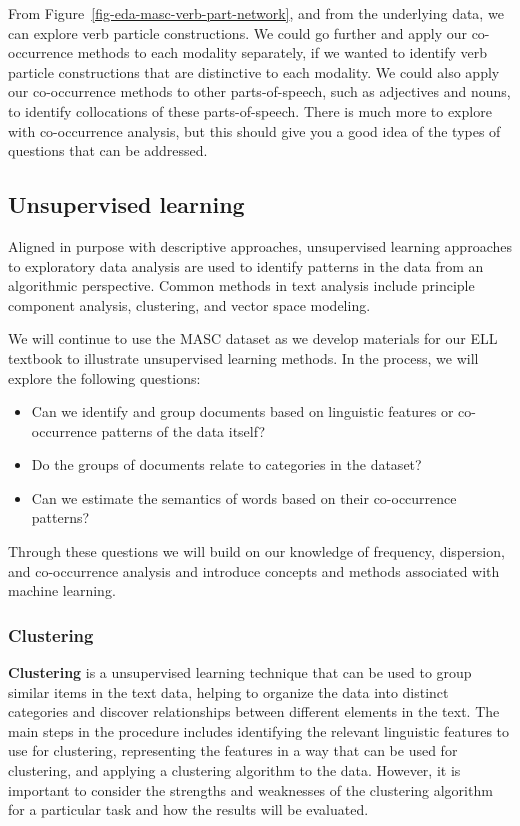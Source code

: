 \documentclass[
  letterpaper,
  DIV=11,
  numbers=noendperiod]{scrreprt}
\providecommand{\tightlist}{%
  \setlength{\itemsep}{0pt}\setlength{\parskip}{0pt}}\usepackage{longtable,booktabs,array}
\theoremstyle{definition}
\theoremstyle{remark}
\begin{document}
From Figure~\ref{fig-eda-masc-verb-part-network}, and from the
underlying data, we can explore verb particle constructions. We could go
further and apply our co-occurrence methods to each modality separately,
if we wanted to identify verb particle constructions that are
distinctive to each modality. We could also apply our co-occurrence
methods to other parts-of-speech, such as adjectives and nouns, to
identify collocations of these parts-of-speech. There is much more to
explore with co-occurrence analysis, but this should give you a good
idea of the types of questions that can be addressed.

\subsection{Unsupervised learning}\label{sec-eda-unsupervised}

Aligned in purpose with descriptive approaches, unsupervised learning
approaches to exploratory data analysis are used to identify patterns in
the data from an algorithmic perspective. Common methods in text
analysis include principle component analysis, clustering, and vector
space modeling.

We will continue to use the MASC dataset as we develop materials for our
ELL textbook to illustrate unsupervised learning methods. In the
process, we will explore the following questions:

\begin{itemize}
\tightlist
\item
  Can we identify and group documents based on linguistic features or
  co-occurrence patterns of the data itself?
\item
  Do the groups of documents relate to categories in the dataset?
\item
  Can we estimate the semantics of words based on their co-occurrence
  patterns?
\end{itemize}

Through these questions we will build on our knowledge of frequency,
dispersion, and co-occurrence analysis and introduce concepts and
methods associated with machine learning.

\subsubsection{Clustering}\label{sec-eda-clustering}

\textbf{Clustering} is a unsupervised learning technique that can be
used to group similar items in the text data, helping to organize the
data into distinct categories and discover relationships between
different elements in the text. The main steps in the procedure includes
identifying the relevant linguistic features to use for clustering,
representing the features in a way that can be used for clustering, and
applying a clustering algorithm to the data. However, it is important to
consider the strengths and weaknesses of the clustering algorithm for a
particular task and how the results will be evaluated.
\end{document}
